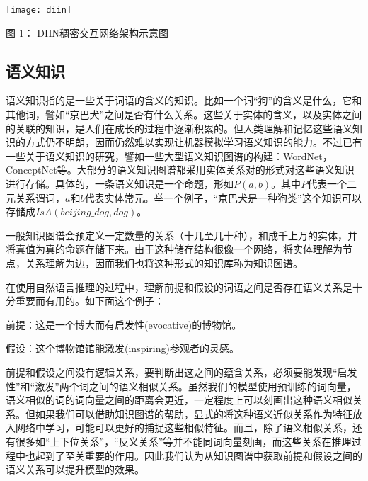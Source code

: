 \documentclass[UTF8,11pt,a4paper,nofonts]{ctexart}
\begin{document}
\begin{table}[htbp!]
\centering
\texttt{[image: diin]}
\caption*{图 1： DIIN稠密交互网络架构示意图}%
\end{table}

\subsection{语义知识}
语义知识指的是一些关于词语的含义的知识。比如一个词“狗”的含义是什么，它和其他词，譬如“京巴犬”之间是否有什么关系。这些关于实体的含义，以及实体之间的关联的知识，是人们在成长的过程中逐渐积累的。但人类理解和记忆这些语义知识的方式仍不明朗，因而仍然难以实现让机器模拟学习语义知识的能力。不过已有一些关于语义知识的研究，譬如一些大型语义知识图谱的构建：WordNet，ConceptNet等。大部分的语义知识图谱都采用实体关系对的形式对这些语义知识进行存储。具体的，一条语义知识是一个命题，形如$P(a, b)$。其中$P$代表一个二元关系谓词，$a$和$b$代表实体常元。举一个例子，“京巴犬是一种狗类”这个知识可以存储成$IsA(beijing\_dog, dog)$。

一般知识图谱会预定义一定数量的关系（十几至几十种），和成千上万的实体，并将真值为真的命题存储下来。由于这种储存结构很像一个网络，将实体理解为节点，关系理解为边，因而我们也将这种形式的知识库称为知识图谱。


在使用自然语言推理的过程中，理解前提和假设的词语之间是否存在语义关系是十分重要而有用的。如下面这个例子：
    

前提：这是一个博大而有启发性(evocative)的博物馆。

假设：这个博物馆馆能激发(inspiring)参观者的灵感。

前提和假设之间没有逻辑关系，要判断出这之间的蕴含关系，必须要能发现“启发性”和“激发”两个词之间的语义相似关系。虽然我们的模型使用预训练的词向量，语义相似的词的词向量之间的距离会更近，一定程度上可以刻画出这种语义相似关系。但如果我们可以借助知识图谱的帮助，显式的将这种语义近似关系作为特征放入网络中学习，可能可以更好的捕捉这些相似特征。而且，除了语义相似关系，还有很多如“上下位关系”，“反义关系”等并不能同词向量刻画，而这些关系在推理过程中也起到了至关重要的作用。因此我们认为从知识图谱中获取前提和假设之间的语义关系可以提升模型的效果。
\end{document}
